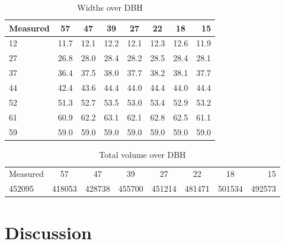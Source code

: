 \begin{table}[h!]
	\begin{center}
		\begin{tabular}{| l c c c c c c r |}
		\hline
		Measured & 57\degree & 47\degree & 39\degree & 27\degree & 22\degree & 18\degree & 15\degree \\
		\hline
		12       & 11.7      & 12.1      & 12.2      & 12.1      & 12.3      & 12.6      & 11.9      \\
		27       & 26.8      & 28.0      & 28.4      & 28.2      & 28.5      & 28.4      & 28.1      \\
		37       & 36.4      & 37.5      & 38.0      & 37.7      & 38.2      & 38.1      & 37.7      \\
		44       & 42.4      & 43.6      & 44.4      & 44.0      & 44.4      & 44.0      & 44.4      \\
		52       & 51.3      & 52.7      & 53.5      & 53.0      & 53.4      & 52.9      & 53.2      \\
		61       & 60.9      & 62.2      & 63.1      & 62.1      & 62.8      & 62.5      & 61.1      \\
		59       & 59.0      & 59.0      & 59.0      & 59.0      & 59.0      & 59.0      & 59.0      \\
		\hline
		\end{tabular}
		\caption{Widths over DBH}
		\label{widths}
    \end{center}
\end{table}

\begin{table}[h!]
	\begin{center}
    	\begin{tabular}{| l c c c c c c r |}
    	\hline
		Measured & 57\degree & 47\degree & 39\degree & 27\degree & 22\degree & 18\degree & 15\degree \\
		452095   & 418053    & 428738    & 455700    & 451214    & 481471    & 501534    & 492573    \\
		\hline
		\end{tabular}
		\caption{Total volume over DBH}
		\label{volumes}
    \end{center}
\end{table}

\section{Discussion}
